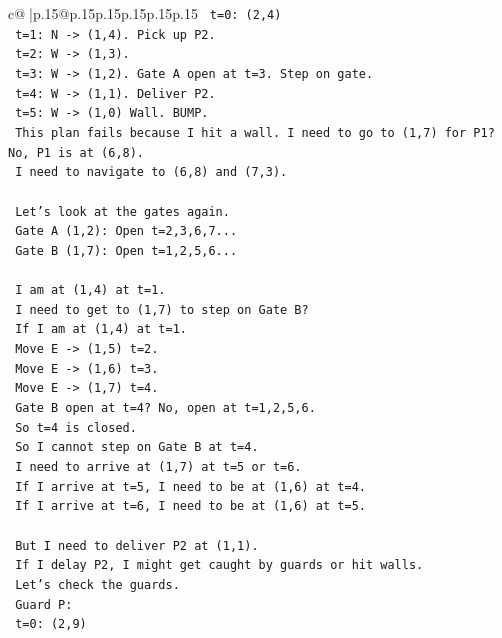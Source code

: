 \documentclass{article}
\begin{document}
{\begin{supertabular}{c@{$\;$}|p{.15\linewidth}@{}p{.15\linewidth}p{.15\linewidth}p{.15\linewidth}p{.15\linewidth}p{.15\linewidth}}
{{{\texttt{   t=0: (2,4)} \\
\texttt{   t=1: N {-}> (1,4). Pick up P2.} \\
\texttt{   t=2: W {-}> (1,3).} \\
\texttt{   t=3: W {-}> (1,2). Gate A open at t=3. Step on gate.} \\
\texttt{   t=4: W {-}> (1,1). Deliver P2.} \\
\texttt{   t=5: W {-}> (1,0) Wall. BUMP.} \\
\texttt{   This plan fails because I hit a wall. I need to go to (1,7) for P1? No, P1 is at (6,8).} \\
\texttt{   I need to navigate to (6,8) and (7,3).} \\
\\ 
\texttt{   Let's look at the gates again.} \\
\texttt{   Gate A (1,2): Open t=2,3,6,7...} \\
\texttt{   Gate B (1,7): Open t=1,2,5,6...} \\
\\ 
\texttt{   I am at (1,4) at t=1.} \\
\texttt{   I need to get to (1,7) to step on Gate B?} \\
\texttt{   If I am at (1,4) at t=1.} \\
\texttt{   Move E {-}> (1,5) t=2.} \\
\texttt{   Move E {-}> (1,6) t=3.} \\
\texttt{   Move E {-}> (1,7) t=4.} \\
\texttt{   Gate B open at t=4? No, open at t=1,2,5,6.} \\
\texttt{   So t=4 is closed.} \\
\texttt{   So I cannot step on Gate B at t=4.} \\
\texttt{   I need to arrive at (1,7) at t=5 or t=6.} \\
\texttt{   If I arrive at t=5, I need to be at (1,6) at t=4.} \\
\texttt{   If I arrive at t=6, I need to be at (1,6) at t=5.} \\
\\ 
\texttt{   But I need to deliver P2 at (1,1).} \\
\texttt{   If I delay P2, I might get caught by guards or hit walls.} \\
\texttt{   Let's check the guards.} \\
\texttt{   Guard P:} \\
\texttt{   t=0: (2,9)} \\
}}}
\end{supertabular}}
\end{document}
